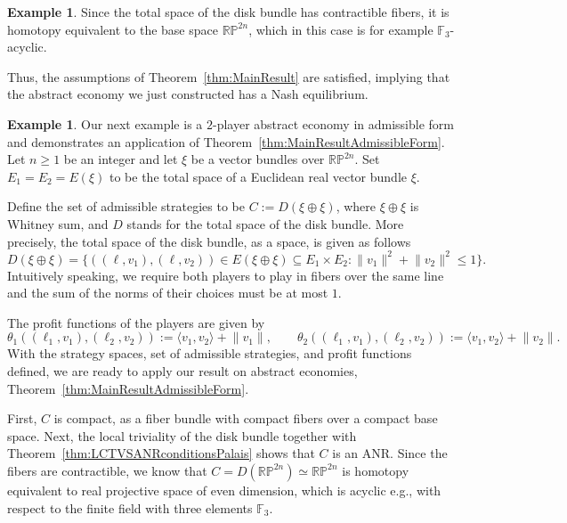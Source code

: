 \documentclass[a4paper,11pt,reqno,english]{amsart}
\theoremstyle{definition}
\newtheorem{example}[theorem]{Example}
\begin{document}
\begin{example}
	Since the total space of the disk bundle has contractible fibers, it is homotopy equivalent to the base space $\mathbb{R}\mathbb{P}^{2n}$, which in this case is for example $\mathbb{F}_3$-acyclic.

	Thus, the assumptions of Theorem~\ref{thm:MainResult} are satisfied, implying that the abstract economy we just constructed has a Nash equilibrium.
\end{example}

\begin{example}
	Our next example is a $2$-player abstract economy in admissible form and demonstrates an application of Theorem~\ref{thm:MainResultAdmissibleForm}. Let $n\geq 1$ be an integer and let $\xi$ be a vector bundles over $\mathbb{R}\mathbb{P}^{2n}$. Set $E_1=E_2= E(\xi)$ to be the total space of a Euclidean real vector bundle $\xi$.

	Define the set of admissible strategies to be $C:= D(\xi\oplus \xi)$, where $\xi\oplus \xi$ is Whitney sum, and $D$ stands for the total space of the disk bundle.
	More precisely, the total space of the disk bundle, as a space, is given as follows
	\begin{displaymath}
		D(\xi\oplus \xi) = \{ ((\ell, v_1), (\ell, v_2)) \in E(\xi\oplus \xi)  \subseteq E_1 \times E_2 : \lVert v_1 \rVert^2 + \lVert v_2 \rVert^2 \leq 1 \}.
	\end{displaymath}
	Intuitively speaking, we require both players to play in fibers over the same line and the sum of the norms of their choices must be at most $1$.

	The profit functions of the players are given by
	\begin{displaymath}
		\theta_1((\ell_1, v_1), (\ell_2, v_2)) := \langle v_1, v_2\rangle + \lVert v_1\rVert, \qquad \theta_2((\ell_1, v_1), (\ell_2, v_2)) := \langle v_1, v_2\rangle + \lVert v_2\rVert.
	\end{displaymath}
	With the strategy spaces, set of admissible strategies, and profit functions defined, we are ready to apply our result on abstract economies, Theorem~\ref{thm:MainResultAdmissibleForm}.

	\medskip
	First, $C$ is compact, as a fiber bundle with compact fibers over a compact base space. Next, the local triviality of the disk bundle together with Theorem~\ref{thm:LCTVSANRconditionsPalais} shows that $C$ is an ANR. Since the fibers are contractible, we know that $C = D(\mathbb{R}\mathbb{P}^{2n}) \simeq \mathbb{R}\mathbb{P}^{2n}$ is homotopy equivalent to real projective space of even dimension, which is acyclic e.g., with respect to the finite field with three elements $\mathbb{F}_3$.


\end{example}
\end{document}
